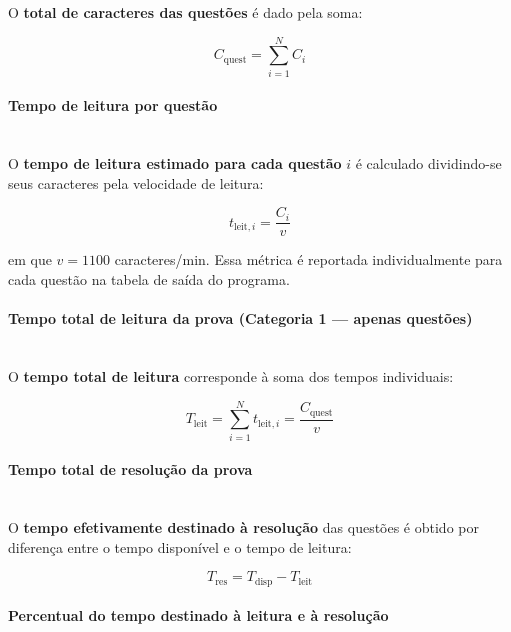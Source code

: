 \documentclass[a4paper,10pt, twocolumn]{article}
\begin{document}
O \textbf{total de caracteres das questões} é dado pela soma:

\begin{equation}
C_{\text{quest}} = \sum_{i=1}^{N} C_i
\label{eq:total_caracteres_questoes}
\end{equation}

\paragraph{Tempo de leitura por questão}
\mbox{}\\

O \textbf{tempo de leitura estimado para cada questão} $i$ é calculado dividindo-se seus caracteres pela velocidade de leitura:

\begin{equation}
t_{\text{leit},i} = \frac{C_i}{v}
\label{eq:tempo_leitura_questao}
\end{equation}

em que $v = 1100$ caracteres/min. Essa métrica é reportada individualmente para cada questão na tabela de saída do programa.

\paragraph{Tempo total de leitura da prova (Categoria 1 — apenas questões)}
\mbox{}\\

O \textbf{tempo total de leitura} corresponde à soma dos tempos individuais:

\begin{equation}
T_{\text{leit}} = \sum_{i=1}^{N} t_{\text{leit},i} = \frac{C_{\text{quest}}}{v}
\label{eq:tempo_leitura_total}
\end{equation}

\paragraph{Tempo total de resolução da prova}
\mbox{}\\

O \textbf{tempo efetivamente destinado à resolução} das questões é obtido por diferença entre o tempo disponível e o tempo de leitura:

\begin{equation}
T_{\text{res}} = T_{\text{disp}} - T_{\text{leit}}
\label{eq:tempo_resolucao_total}
\end{equation}

\paragraph{Percentual do tempo destinado à leitura e à resolução}
\mbox{}\\
\end{document}
